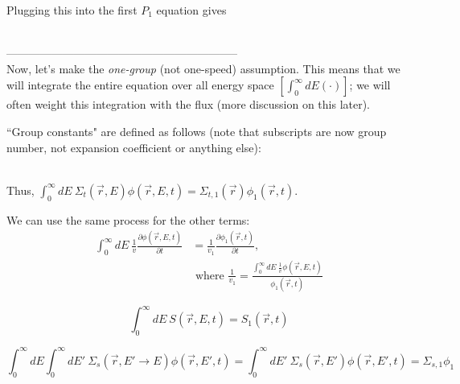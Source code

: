 \documentclass[12pt]{article}
\newif\ifeqns
\newcommand{\rvec}{\ensuremath{\vec{r}}}
\newcommand{\sigsi}{\ensuremath{\Sigma_{s,1}}}
\begin{document}
Plugging this into the first $P_1$ equation gives
\ifeqns
\begin{align*}
\frac{1}{v}\frac{\partial\phi(\rvec,E,t)}{\partial t} = &S(\rvec,E,t) + 
\int^{\infty}_0dE'\:\Sigma_s(\rvec,E'\rightarrow E)\phi(\rvec,E',t) - 
\Sigma_t(\rvec,E)\phi(\rvec,E,t) \\&+ \nabla\cdot[D(\rvec,E)\nabla\phi(\rvec,E,t)]\:.
\end{align*}
\else
\vspace*{5em}\\
\fi


--------------------------------------------------------------\\
Now, let's make the \emph{one-group} (not one-speed) assumption. This means that we will integrate the
entire equation over all energy space $[\int_0^{\infty}dE(\cdot)]$; we will often weight this integration with the flux (more discussion on this later).

``Group constants" are defined as follows (note that subscripts are now group number, not expansion coefficient or  anything else):

\ifeqns
\begin{align*}
\Sigma_{t,1}(\rvec)&=\frac{\int_0^{\infty}dE\:\Sigma_t(\rvec,E)\phi(\rvec,E,t)}{\int_0^{\infty}dE\phi(\rvec,E,t)}
= \text{effective group cross section}\\
%
\phi_1(\rvec,t) &= \int_0^{\infty}dE\:\phi(\rvec,E,t) = \text{group flux}
\end{align*}
\else
\vspace*{6em}\\
\fi

Thus, $\int_0^{\infty}dE\:\Sigma_t(\rvec,E)\phi(\rvec,E,t) = \Sigma_{t,1}(\rvec)\phi_1(\rvec,t)$.

We can use the same process for the other terms:
\ifeqns
\begin{align*}
\int_0^{\infty}dE\:\frac{1}{v}\frac{\partial\phi(\rvec,E,t)}{\partial t} &= 
\frac{1}{v_1}\frac{\partial \phi_1(\rvec,t)}{\partial t}, \\
%
&\text{ where } \frac{1}{v_1} = \frac{\int_0^{\infty}dE\:\frac{1}{v}\phi(\rvec,E,t)}{\phi_1(\rvec,t)}
\end{align*}

\begin{equation*}
\int_0^{\infty}dE\:S(\rvec,E,t) = S_1(\rvec,t)
\end{equation*}

\begin{equation*}
\int_0^{\infty}dE\int_0^{\infty}dE'\:\Sigma_s(\rvec,E'\rightarrow E)\phi(\rvec,E',t) =
\int_0^{\infty}dE'\:\Sigma_s(\rvec,E')\phi(\rvec,E',t) = \sigsi\phi_1
\end{equation*}
\end{document}
